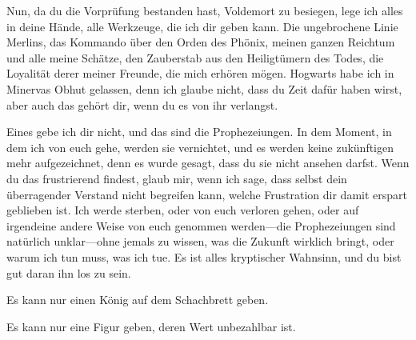 \begin{writtenNote}
Nun, da du die Vorprüfung bestanden hast, Voldemort zu besiegen, lege ich alles in deine Hände, alle Werkzeuge, die ich dir geben kann. Die ungebrochene Linie Merlins, das Kommando über den Orden des Phönix, meinen ganzen Reichtum und alle meine Schätze, den Zauberstab aus den Heiligtümern des Todes, die Loyalität derer meiner Freunde, die mich erhören mögen.
Hogwarts habe ich in Minervas Obhut gelassen, denn ich glaube nicht, dass du Zeit dafür haben wirst, aber auch das gehört dir, wenn du es von ihr verlangst.

Eines gebe ich dir nicht, und das sind die Prophezeiungen. In dem Moment, in dem ich von euch gehe, werden sie vernichtet, und es werden keine zukünftigen mehr aufgezeichnet, denn es wurde gesagt, dass du sie nicht ansehen darfst. Wenn du das frustrierend findest, glaub mir, wenn ich sage, dass selbst dein überragender Verstand nicht begreifen kann, welche Frustration dir damit erspart geblieben ist.
Ich werde sterben, oder von euch verloren gehen, oder auf irgendeine andere Weise von euch genommen werden—die Prophezeiungen sind natürlich unklar—ohne jemals zu wissen, was die Zukunft wirklich bringt, oder warum ich tun muss, was ich tue. Es ist alles kryptischer Wahnsinn, und du bist gut daran ihn los zu sein.

Es kann nur einen König auf dem Schachbrett geben.

Es kann nur eine Figur geben, deren Wert unbezahlbar ist.


\end{writtenNote}
